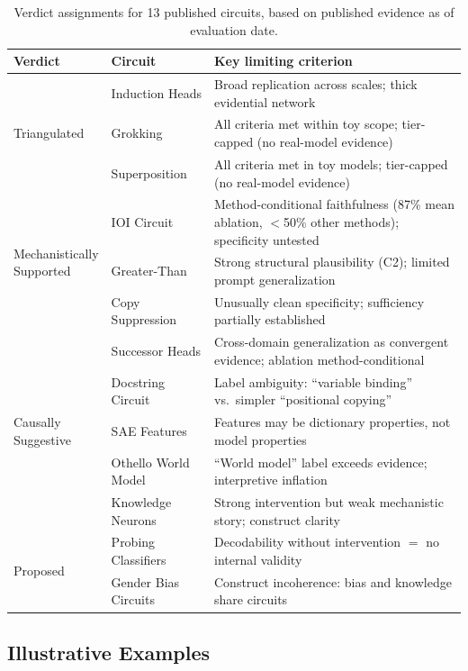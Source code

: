 \documentclass[10pt]{article}
\newcommand{\tighttable}{\setlength{\tabcolsep}{4pt}\renewcommand{\arraystretch}{1.05}}
\begin{document}
\begin{table}[t]
\centering
\tighttable
\caption{Verdict assignments for 13 published circuits, based on published evidence as of evaluation date.}
\label{tab:case-studies}
\small
\begin{tabular}{@{}llp{6.5cm}@{}}
\toprule
\textbf{Verdict} & \textbf{Circuit} & \textbf{Key limiting criterion} \\
\midrule
\multirow{3}{*}{Triangulated} & Induction Heads & Broad replication across scales; thick evidential network \\
& Grokking & All criteria met within toy scope; tier-capped (no real-model evidence) \\
& Superposition & All criteria met in toy models; tier-capped (no real-model evidence) \\
\midrule
\multirow{3}{*}{\parbox{2.3cm}{Mechanistically\\Supported}} & IOI Circuit & Method-conditional faithfulness (87\% mean ablation, $<$50\% other methods); specificity untested \\
& Greater-Than & Strong structural plausibility (C2); limited prompt generalization \\
& Copy Suppression & Unusually clean specificity; sufficiency partially established \\
\midrule
\multirow{5}{*}{\parbox{2.3cm}{Causally\\Suggestive}} & Successor Heads & Cross-domain generalization as convergent evidence; ablation method-conditional \\
& Docstring Circuit & Label ambiguity: ``variable binding'' vs.\ simpler ``positional copying'' \\
& SAE Features & Features may be dictionary properties, not model properties \\
& Othello World Model & ``World model'' label exceeds evidence; interpretive inflation \\
& Knowledge Neurons & Strong intervention but weak mechanistic story; construct clarity \\
\midrule
\multirow{2}{*}{Proposed} & Probing Classifiers & Decodability without intervention $=$ no internal validity \\
& Gender Bias Circuits & Construct incoherence: bias and knowledge share circuits \\
\bottomrule
\end{tabular}
\end{table}

\subsection{Illustrative Examples}
\end{document}
